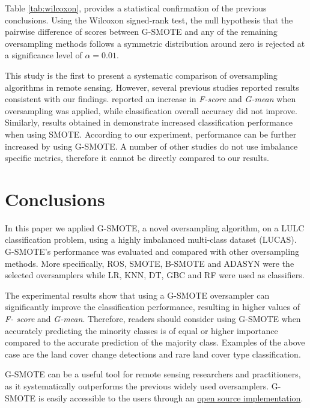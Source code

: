 \documentclass[remotesensing,article,submit,moreauthors,pdftex]{Definitions/mdpi}
\begin{document}
Table \ref{tab:wilcoxon}, provides a statistical confirmation of the previous
conclusions. Using the Wilcoxon signed-rank test, the null hypothesis that the
pairwise difference of scores between G-SMOTE and any of the remaining
oversampling methods follows a symmetric distribution around zero is rejected at
a significance level of $\alpha = 0.01$.

This study is the first to present a systematic comparison of oversampling
algorithms in remote sensing. However, several previous studies reported results
consistent with our findings. \cite{Bogner2018} reported an increase in
\textit{F-score} and \textit{G-mean} when oversampling was applied, while
classification overall accuracy did not improve. Similarly, results obtained in
\cite{Feng2019} demonstrate increased classification performance when using
SMOTE. According to our experiment, performance can be further increased by
using G-SMOTE. A number of other studies \cite{Cenggoro2018, Maxwell2018} do not
use imbalance specific metrics, therefore it cannot be directly compared to our
results.

\section{Conclusions}

In this paper we applied G-SMOTE, a novel oversampling algorithm, on a LULC
classification problem, using a highly imbalanced multi-class dataset (LUCAS).
G-SMOTE's performance was evaluated and compared with other oversampling
methods. More specifically, ROS, SMOTE, B-SMOTE and ADASYN were the selected
oversamplers while LR, KNN, DT, GBC and RF were used as classifiers.

The experimental results show that using a G-SMOTE oversampler can significantly
improve the classification performance, resulting in higher values of \textit{F-
score} and \textit{G-mean}. Therefore, readers should consider using G-SMOTE
when accurately predicting the minority classes is of equal or higher importance
compared to the accurate prediction of the majority class. Examples of the above
case are the land cover change detections and rare land cover type
classification.

G-SMOTE can be a useful tool for remote sensing researchers and practitioners,
as it systematically outperforms the previous widely used oversamplers.
G-SMOTE is easily accessible to the users through an
\href{https://geometric-smote.readthedocs.io/en/latest/?badge=latest}{open
	source implementation}.
\end{document}
